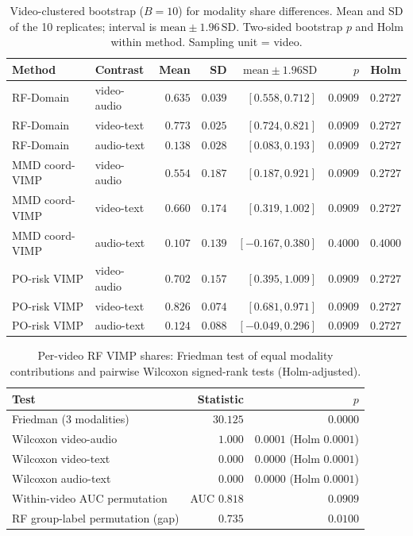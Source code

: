 \begin{table}[ht]\centering
\caption{Video-clustered bootstrap ($B=10$) for modality share differences. Mean and SD of the 10 replicates; interval is $\mathrm{mean}\pm 1.96\,\mathrm{SD}$. Two-sided bootstrap $p$ and Holm within method. Sampling unit = video.}
\label{tab:msrvtt-mm-bootstrap}
\small
\begin{tabular}{@{}l l r r r r c@{}}\toprule
Method & Contrast & Mean & SD & $\mathrm{mean}\pm 1.96\mathrm{SD}$ & $p$ & Holm \\
\midrule
RF-Domain & video-audio & $0.635$ & $0.039$ & $[0.558, 0.712]$ & $0.0909$ & $0.2727$ \\
RF-Domain & video-text & $0.773$ & $0.025$ & $[0.724, 0.821]$ & $0.0909$ & $0.2727$ \\
RF-Domain & audio-text & $0.138$ & $0.028$ & $[0.083, 0.193]$ & $0.0909$ & $0.2727$ \\
MMD coord-VIMP & video-audio & $0.554$ & $0.187$ & $[0.187, 0.921]$ & $0.0909$ & $0.2727$ \\
MMD coord-VIMP & video-text & $0.660$ & $0.174$ & $[0.319, 1.002]$ & $0.0909$ & $0.2727$ \\
MMD coord-VIMP & audio-text & $0.107$ & $0.139$ & $[-0.167, 0.380]$ & $0.4000$ & $0.4000$ \\
PO-risk VIMP & video-audio & $0.702$ & $0.157$ & $[0.395, 1.009]$ & $0.0909$ & $0.2727$ \\
PO-risk VIMP & video-text & $0.826$ & $0.074$ & $[0.681, 0.971]$ & $0.0909$ & $0.2727$ \\
PO-risk VIMP & audio-text & $0.124$ & $0.088$ & $[-0.049, 0.296]$ & $0.0909$ & $0.2727$ \\
\bottomrule\end{tabular}\end{table}

\begin{table}[ht]\centering
\caption{Per-video RF VIMP shares: Friedman test of equal modality contributions and pairwise Wilcoxon signed-rank tests (Holm-adjusted).}
\label{tab:msrvtt-mm-pervideo-tests}
\small
\begin{tabular}{@{}l r r@{}}\toprule
Test & Statistic & $p$ \\
\midrule
Friedman (3 modalities) & $30.125$ & $0.0000$ \\
Wilcoxon video-audio & $1.000$ & $0.0001$ (Holm $0.0001$) \\
Wilcoxon video-text & $0.000$ & $0.0000$ (Holm $0.0001$) \\
Wilcoxon audio-text & $0.000$ & $0.0000$ (Holm $0.0001$) \\
Within-video AUC permutation & AUC $0.818$ & $0.0909$ \\
RF group-label permutation (gap) & $0.735$ & $0.0100$ \\
\bottomrule\end{tabular}\end{table}

